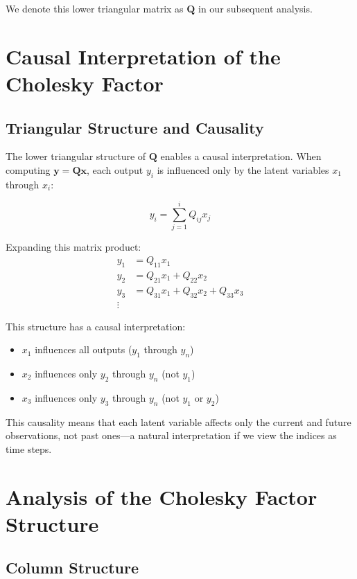 \documentclass{article}
\begin{document}
We denote this lower triangular matrix as $\mathbf{Q}$ in our subsequent analysis.

\section{Causal Interpretation of the Cholesky Factor}

\subsection{Triangular Structure and Causality}

The lower triangular structure of $\mathbf{Q}$ enables a causal interpretation. When computing $\mathbf{y} = \mathbf{Q}\mathbf{x}$, each output $y_i$ is influenced only by the latent variables $x_1$ through $x_i$:

\begin{equation}
y_i = \sum_{j=1}^{i} Q_{ij}x_j
\end{equation}

Expanding this matrix product:
\begin{align}
y_1 &= Q_{11}x_1 \\
y_2 &= Q_{21}x_1 + Q_{22}x_2 \\
y_3 &= Q_{31}x_1 + Q_{32}x_2 + Q_{33}x_3 \\
\vdots
\end{align}

This structure has a causal interpretation:
\begin{itemize}
    \item $x_1$ influences all outputs ($y_1$ through $y_n$)
    \item $x_2$ influences only $y_2$ through $y_n$ (not $y_1$)
    \item $x_3$ influences only $y_3$ through $y_n$ (not $y_1$ or $y_2$)
\end{itemize}

This causality means that each latent variable affects only the current and future observations, not past ones—a natural interpretation if we view the indices as time steps.

\section{Analysis of the Cholesky Factor Structure}

\subsection{Column Structure}
\end{document}
